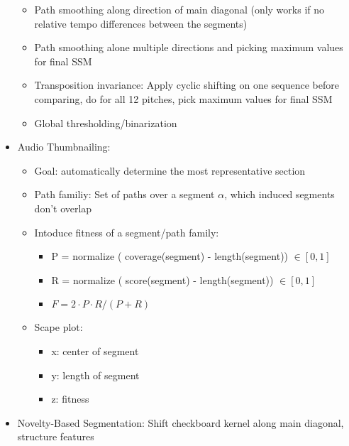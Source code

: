 \documentclass{scrartcl}
\begin{document}
\begin{itemize}
\begin{itemize}
            \item
                Path smoothing along direction of main diagonal (only works if no relative tempo differences between the segments)
            \item
                Path smoothing alone multiple directions and picking maximum values for final SSM
            \item
                Transposition invariance: Apply cyclic shifting on one sequence before comparing, do for all 12 pitches, pick maximum values for final SSM
            \item
                Global thresholding/binarization
        \end{itemize}
    \item
        Audio Thumbnailing:
        \begin{itemize}
            \item
                Goal: automatically determine the most representative section
            \item
                Path familiy: Set of paths over a segment $\alpha$, which induced segments don't overlap
            \item
                Intoduce fitness of a segment/path family:
                \begin{itemize}
                    \item
                        P = normalize ( coverage(segment) - length(segment)) $\in [0,1]$
                    \item
                        R = normalize ( score(segment) - length(segment)) $\in [0,1]$
                    \item
                        $ F = 2 \cdot P \cdot R / (P + R)$
                \end{itemize}
            \item
                Scape plot:
                \begin{itemize}
                    \item
                        x: center of segment
                    \item
                        y: length of segment
                    \item
                        z: fitness
                \end{itemize}
        \end{itemize}
    \item
        Novelty-Based Segmentation: Shift checkboard kernel along main diagonal, structure features
\end{itemize}
\end{document}
